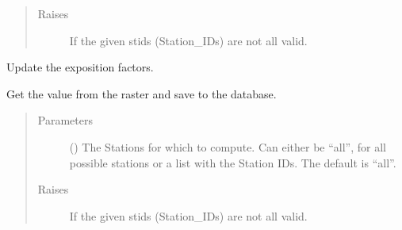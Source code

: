 \documentclass[letterpaper,10pt,english]{sphinxmanual}
\begin{document}
\begin{fulllineitems}
\begin{fulllineitems}
\begin{quote}
\begin{description}
\item[{Raises}] \leavevmode
\sphinxAtStartPar
{} \textendash{} If the given stids (Station\_IDs) are not all valid.

\end{description}\end{quote}

\end{fulllineitems}


\begin{fulllineitems}
\label{\detokenize{weatherDB:weatherDB.stations.StationsTETBase.update_exp_fact}}
\sphinxAtStartPar
Update the exposition factors.

\sphinxAtStartPar
Get the value from the raster and save to the database.
\begin{quote}\begin{description}
\item[{Parameters}] \leavevmode
\sphinxAtStartPar
{} (\sphinxstyleliteralemphasis{\sphinxupquote{, }}) \textendash{} The Stations for which to compute.
Can either be “all”, for all possible stations
or a list with the Station IDs.
The default is “all”.

\item[{Raises}] \leavevmode
\sphinxAtStartPar
{} \textendash{} If the given stids (Station\_IDs) are not all valid.

\end{description}\end{quote}

\end{fulllineitems}


\end{fulllineitems}

\end{document}
